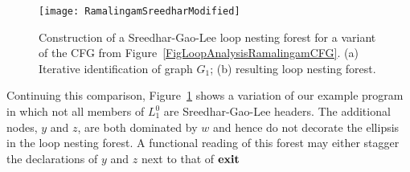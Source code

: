 \begin{description}
    \begin{figure}
      \begin{center}
        \texttt{[image: RamalingamSreedharModified]}
      \end{center}
      \caption{\label{FigLoopAnalysisRamalingamSreedharModified}
        Construction of a Sreedhar-Gao-Lee loop nesting forest for a
        variant of the CFG from
        Figure~\ref{FigLoopAnalysisRamalingamCFG}. (a) Iterative
        identification of graph $G_1$; (b) resulting loop nesting
        forest.}
    \end{figure}

    Continuing this comparison,
    Figure~\ref{FigLoopAnalysisRamalingamSreedharModified} shows a
    variation of our example program in which not all members of
    $L^0_1$ are Sreedhar-Gao-Lee headers. The additional nodes, $y$
    and $z$, are both dominated by $w$ and hence do not decorate the
    ellipsis in the loop nesting forest. A functional reading of this
    forest may either stagger the declarations of $y$ and $z$ next to
    that of $\mathbf{exit}$


\end{description}
